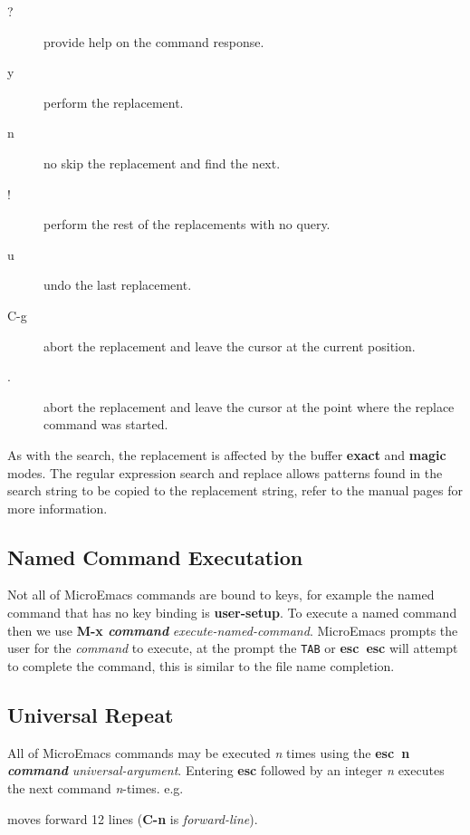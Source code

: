\documentclass[11pt,a4paper,pdftex]{article}
\begin{document}
  \begin{description}
    \item[?] provide help on the command response.
    \item[y] perform the replacement.
    \item[n] no skip the replacement and find the next.
    \item[!] perform the rest of the replacements with no query.
    \item[u] undo the last replacement.
    \item[C-g] abort the replacement and leave the cursor at the current
    position.
    \item[.] abort the replacement and leave the cursor at the point where the
    replace command was started.
  \end{description}

  As with the search, the replacement is affected by the buffer \textbf{exact}
  and \textbf{magic} modes. The regular expression search and replace allows
  patterns found in the search string to be copied to the replacement string,
  refer to the manual pages for more information.

\subsection{Named Command Executation}

  Not all of MicroEmacs commands are bound to keys, for example the named
  command that has no key binding is \textbf{user-setup}. To execute a named
  command then we use \textbf{M-x \textit{command}}
  \textit{execute-named-command}. MicroEmacs prompts the user for the
  \textit{command} to execute, at the prompt the \texttt{TAB} or
  \textbf{esc~esc} will attempt to complete the command, this is similar to
  the file name completion.

\subsection{Universal Repeat}

  All of MicroEmacs commands may be executed \textit{n} times using the
  \textbf{esc~n \textit{command}} \textit{universal-argument}. Entering
  \textbf{esc} followed by an integer \textit{n} executes the next command
  \textit{n}-times. e.g.


  moves forward 12 lines (\textbf{C-n} is \textit{forward-line}).
\end{document}
